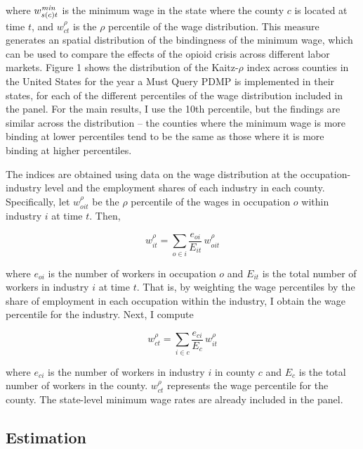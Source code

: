 \documentclass[12pt,a4paper]{article}
\begin{document}
where \(w^{\text{\textit{min}}}_{s(c)t}\) is the minimum wage in the state where the county \(c\) is located at time \(t\), and \(w^{\rho}_{ct}\) is the \(\rho\) percentile of the wage distribution.
This measure generates an spatial distribution of the bindingness of the minimum wage, which can be used to compare the effects of the opioid crisis across different labor markets.
Figure 1 shows the distribution of the Kaitz-\(\rho\) index across counties in the United States for the year a Must Query PDMP is implemented in their states, for each of the different percentiles of the wage distribution included in the panel.
For the main results, I use the 10th percentile, but the findings are similar across the distribution -- the counties where the minimum wage is more binding at lower percentiles tend to be the same as those where it is more binding at higher percentiles.

The indices are obtained using data on the wage distribution at the occupation-industry level and the employment shares of each industry in each county. 
Specifically, let \(w^{\rho}_{oit}\) be the \(\rho\) percentile of the wages in occupation \(o\) within industry \(i\) at time \(t\). 
Then,

\begin{equation}
    w^{\rho}_{it} = \sum_{o\in i} \dfrac{e_{oi}}{E_{it}}\,w^{\rho}_{oit}
\end{equation}

where \(e_{oi}\) is the number of workers in occupation \(o\) and \(E_{it}\) is the total number of workers in industry \(i\) at time \(t\).
That is, by weighting the wage percentiles by the share of employment in each occupation within the industry, I obtain the wage percentile for the industry.
Next, I compute

\begin{equation}
    w^{\rho}_{ct} = \sum_{i\in c} \dfrac{e_{ci}}{E_c}\,w^{\rho}_{it}
\end{equation}

where \(e_{ci}\) is the number of workers in industry \(i\) in county \(c\) and \(E_c\) is the total number of workers in the county.
\(w^{\rho}_{ct}\) represents the wage percentile for the county.
The state-level minimum wage rates are already included in the panel.

\subsection*{Estimation}
\end{document}

